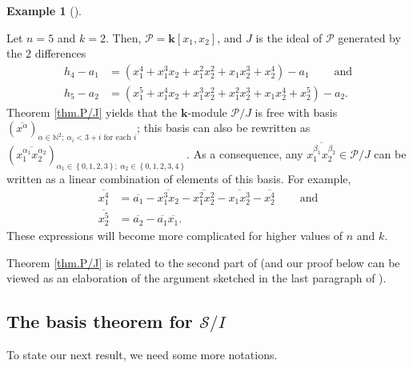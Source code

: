 \documentclass[numbers=enddot,12pt,final,onecolumn,notitlepage]{scrartcl}%
\theoremstyle{definition}
\newtheorem{exmp}[theo]{Example}
\newenvironment{example}[1][]
{\begin{exmp}[#1]\begin{leftbar}}
{\end{leftbar}\end{exmp}}
\begin{document}
\begin{example}
Let $n=5$ and $k=2$. Then, $\mathcal{P}=\mathbf{k}\left[  x_{1},x_{2}\right]
$, and $J$ is the ideal of $\mathcal{P}$ generated by the $2$ differences
\begin{align*}
h_{4}-a_{1}  &  =\left(  x_{1}^{4}+x_{1}^{3}x_{2}+x_{1}^{2}x_{2}^{2}%
+x_{1}x_{2}^{3}+x_{2}^{4}\right)  -a_{1}\ \ \ \ \ \ \ \ \ \ \text{and}\\
h_{5}-a_{2}  &  =\left(  x_{1}^{5}+x_{1}^{4}x_{2}+x_{1}^{3}x_{2}^{2}+x_{1}%
^{2}x_{2}^{3}+x_{1}x_{2}^{4}+x_{2}^{5}\right)  -a_{2}.
\end{align*}
Theorem \ref{thm.P/J} yields that the $\mathbf{k}$-module $\mathcal{P}/J$ is
free with basis $\left(  \overline{x^{\alpha}}\right)  _{\alpha\in
\mathbb{N}^{2};\ \alpha_{i}<3+i\text{ for each }i}$; this basis can also be
rewritten as $\left(  \overline{x_{1}^{\alpha_{1}}x_{2}^{\alpha_{2}}}\right)
_{\alpha_{1}\in\left\{  0,1,2,3\right\}  ;\ \alpha_{2}\in\left\{
0,1,2,3,4\right\}  }$. As a consequence, any $\overline{x_{1}^{\beta_{1}}%
x_{2}^{\beta_{2}}}\in\mathcal{P}/J$ can be written as a linear combination of
elements of this basis. For example,%
\begin{align*}
\overline{x_{1}^{4}}  &  =\overline{a_{1}}-\overline{x_{1}^{3}x_{2}}%
-\overline{x_{1}^{2}x_{2}^{2}}-\overline{x_{1}x_{2}^{3}}-\overline{x_{2}^{4}%
}\ \ \ \ \ \ \ \ \ \ \text{and}\\
\overline{x_{2}^{5}}  &  =\overline{a_{2}}-\overline{a_{1}}\overline{x_{1}}.
\end{align*}
These expressions will become more complicated for higher values of $n$ and
$k$.
\end{example}

Theorem \ref{thm.P/J} is related to the second part of \cite[Proposition
2.9]{CoKrWa09} (and our proof below can be viewed as an elaboration of the
argument sketched in the last paragraph of \cite[proof of Proposition
2.9]{CoKrWa09}).

\subsection{The basis theorem for $\mathcal{S}/I$}

To state our next result, we need some more notations.
\end{document}
